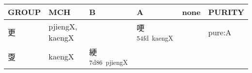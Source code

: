 \documentclass[14pt,a4paper]{scrartcl}
\begin{document}
\begin{longtable}[c]{@{}llllll@{}}
\toprule
\begin{minipage}[b]{0.14\columnwidth}\raggedright\strut
GROUP
\strut\end{minipage} &
\begin{minipage}[b]{0.14\columnwidth}\raggedright\strut
MCH
\strut\end{minipage} &
\begin{minipage}[b]{0.14\columnwidth}\raggedright\strut
B
\strut\end{minipage} &
\begin{minipage}[b]{0.14\columnwidth}\raggedright\strut
A
\strut\end{minipage} &
\begin{minipage}[b]{0.14\columnwidth}\raggedright\strut
none
\strut\end{minipage} &
\begin{minipage}[b]{0.14\columnwidth}\raggedright\strut
PURITY
\strut\end{minipage}\tabularnewline
\midrule
\endhead
\begin{minipage}[t]{0.14\columnwidth}\raggedright\strut
更
\strut\end{minipage} &
\begin{minipage}[t]{0.14\columnwidth}\raggedright\strut
pjiengX, kaengX
\strut\end{minipage} &
\begin{minipage}[t]{0.14\columnwidth}\raggedright\strut
\strut\end{minipage} &
\begin{minipage}[t]{0.14\columnwidth}\raggedright\strut
哽\textsuperscript{54fd~kaengX}
\strut\end{minipage} &
\begin{minipage}[t]{0.14\columnwidth}\raggedright\strut
\strut\end{minipage} &
\begin{minipage}[t]{0.14\columnwidth}\raggedright\strut
pure:A
\strut\end{minipage}\tabularnewline
\begin{minipage}[t]{0.14\columnwidth}\raggedright\strut
㪅
\strut\end{minipage} &
\begin{minipage}[t]{0.14\columnwidth}\raggedright\strut
kaengX
\strut\end{minipage} &
\begin{minipage}[t]{0.14\columnwidth}\raggedright\strut
綆\textsuperscript{7d86~pjiengX}
\strut\end{minipage} &

\end{longtable}
\end{document}
